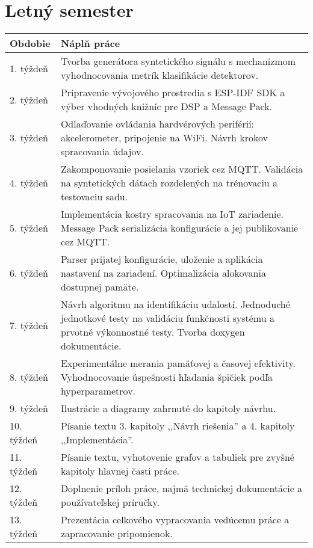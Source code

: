 \section{Letný semester}
\begin{table}[h!]
\def\arraystretch{1.25}
\begin{tabular}{|l|p{12cm}|}
\hline
\textbf{Obdobie} & \textbf{Náplň práce}                                                                                                                                            \\ \hline
1. týždeň        & Tvorba generátora syntetického signálu s mechanizmom vyhodnocovania metrík  klasifikácie detektorov.                                                            \\ \hline
2. týždeň        & Pripravenie vývojového prostredia s ESP-IDF SDK a výber  vhodných knižníc  pre DSP a Message Pack.                                                              \\ \hline
3. týždeň        & Odlaďovanie ovládania hardvérových periférií: akcelerometer, pripojenie na WiFi.  Návrh krokov spracovania údajov.                                                \\ \hline
4. týždeň        & Zakomponovanie posielania vzoriek cez MQTT. Validácia na syntetických dátach rozdelených na trénovaciu a testovaciu sadu.                                       \\ \hline
5. týždeň        & Implementácia kostry spracovania na IoT zariadenie. Message Pack serializácia  konfigurácie a jej publikovanie  cez MQTT. \\ \hline
6. týždeň        & Parser prijatej konfigurácie, uloženie a aplikácia nastavení na zariadení.  Optimalizácia alokovania dostupnej pamäte.                                          \\ \hline
7. týždeň        & Návrh algoritmu na identifikáciu udalostí. Jednoduché jednotkové testy na validáciu funkčnosti systému a prvotné výkonnostné testy. Tvorba doxygen dokumentácie. \\ \hline
8. týždeň        & Experimentálne merania pamäťovej a časovej efektivity. Vyhodnocovanie úspešnosti hľadania špičiek podľa hyperparametrov. \\ \hline
9. týždeň        & Ilustrácie a diagramy zahrnuté do kapitoly návrhu. \\ \hline
10. týždeň       & Písanie textu 3. kapitoly ,,Návrh riešenia'' a 4. kapitoly ,,Implementácia''. \\ \hline
11. týždeň       & Písanie textu, vyhotovenie grafov a tabuliek pre zvyšné kapitoly  hlavnej časti práce. \\ \hline
12. týždeň       & Doplnenie príloh práce, najmä technickej dokumentácie a  používateľskej príručky.                                                                                 \\ \hline
13. týždeň       & Prezentácia celkového vypracovania vedúcemu práce a zapracovanie pripomienok.                                                                                                           \\ \hline
\end{tabular}
\end{table}


